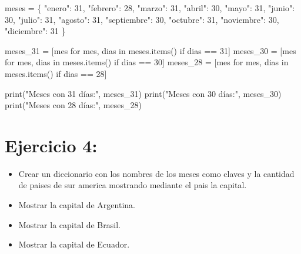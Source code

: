 \documentclass[
  a4paper,
  DIV=11,
  numbers=noendperiod,
  onepage,
  openany]{scrreprt}
\newenvironment{Shaded}{\begin{snugshade}}{\end{snugshade}}
\newcommand{\BuiltInTok}[1]{\textcolor[rgb]{0.00,0.23,0.31}{#1}}
\newcommand{\ControlFlowTok}[1]{\textcolor[rgb]{0.00,0.23,0.31}{#1}}
\newcommand{\DecValTok}[1]{\textcolor[rgb]{0.68,0.00,0.00}{#1}}
\newcommand{\KeywordTok}[1]{\textcolor[rgb]{0.00,0.23,0.31}{#1}}
\newcommand{\NormalTok}[1]{\textcolor[rgb]{0.00,0.23,0.31}{#1}}
\newcommand{\OperatorTok}[1]{\textcolor[rgb]{0.37,0.37,0.37}{#1}}
\newcommand{\StringTok}[1]{\textcolor[rgb]{0.13,0.47,0.30}{#1}}
\providecommand{\tightlist}{%
  \setlength{\itemsep}{0pt}\setlength{\parskip}{0pt}}\usepackage{longtable,booktabs,array}
\begin{document}
\begin{Shaded}
\begin{Highlighting}[]
\NormalTok{meses }\OperatorTok{=}\NormalTok{ \{}
    \StringTok{"enero"}\NormalTok{: }\DecValTok{31}\NormalTok{,}
    \StringTok{"febrero"}\NormalTok{: }\DecValTok{28}\NormalTok{,}
    \StringTok{"marzo"}\NormalTok{: }\DecValTok{31}\NormalTok{,}
    \StringTok{"abril"}\NormalTok{: }\DecValTok{30}\NormalTok{,}
    \StringTok{"mayo"}\NormalTok{: }\DecValTok{31}\NormalTok{,}
    \StringTok{"junio"}\NormalTok{: }\DecValTok{30}\NormalTok{,}
    \StringTok{"julio"}\NormalTok{: }\DecValTok{31}\NormalTok{,}
    \StringTok{"agosto"}\NormalTok{: }\DecValTok{31}\NormalTok{,}
    \StringTok{"septiembre"}\NormalTok{: }\DecValTok{30}\NormalTok{,}
    \StringTok{"octubre"}\NormalTok{: }\DecValTok{31}\NormalTok{,}
    \StringTok{"noviembre"}\NormalTok{: }\DecValTok{30}\NormalTok{,}
    \StringTok{"diciembre"}\NormalTok{: }\DecValTok{31}
\NormalTok{\}}

\NormalTok{meses\_31 }\OperatorTok{=}\NormalTok{ [mes }\ControlFlowTok{for}\NormalTok{ mes, dias }\KeywordTok{in}\NormalTok{ meses.items() }\ControlFlowTok{if}\NormalTok{ dias }\OperatorTok{==} \DecValTok{31}\NormalTok{]}
\NormalTok{meses\_30 }\OperatorTok{=}\NormalTok{ [mes }\ControlFlowTok{for}\NormalTok{ mes, dias }\KeywordTok{in}\NormalTok{ meses.items() }\ControlFlowTok{if}\NormalTok{ dias }\OperatorTok{==} \DecValTok{30}\NormalTok{]}
\NormalTok{meses\_28 }\OperatorTok{=}\NormalTok{ [mes }\ControlFlowTok{for}\NormalTok{ mes, dias }\KeywordTok{in}\NormalTok{ meses.items() }\ControlFlowTok{if}\NormalTok{ dias }\OperatorTok{==} \DecValTok{28}\NormalTok{]}

\BuiltInTok{print}\NormalTok{(}\StringTok{"Meses con 31 días:"}\NormalTok{, meses\_31)}
\BuiltInTok{print}\NormalTok{(}\StringTok{"Meses con 30 días:"}\NormalTok{, meses\_30)}
\BuiltInTok{print}\NormalTok{(}\StringTok{"Meses con 28 días:"}\NormalTok{, meses\_28)}
\end{Highlighting}
\end{Shaded}

\section{Ejercicio 4:}\label{ejercicio-4-4}

\begin{itemize}
\tightlist
\item
  Crear un diccionario con los nombres de los meses como claves y la
  cantidad de paises de sur america mostrando mediante el pais la
  capital.
\item
  Mostrar la capital de Argentina.
\item
  Mostrar la capital de Brasil.
\item
  Mostrar la capital de Ecuador.
\end{itemize}
\end{document}
